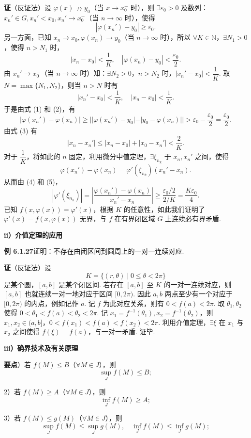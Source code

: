 \documentclass[UTF8,12pt,a4paper,fontset=fandol]{ctexart}
\begin{document}
\noindent\textbf{证}\quad （反证法）设 $\varphi(x)\nrightarrow y_0$（当 $x\to x_0^-$ 时），则 $\exists\varepsilon_0>0$ 及数列：$x_n'\in G,x_n'<x_0,x_n'\to x_0^-$（当 $n\to\infty$ 时），使得
\[
  |\varphi(x_n')-y_0|\ge\varepsilon_0. \tag{1}
\]
另一方面，已知 $x_n\to x_0,\varphi(x_n)\to y_0$（当 $n\to\infty$ 时），所以 $\forall K\in\mathbb{N}$，$\exists N_1>0$，使得 $n>N_1$ 时，
\[
  |x_n-x_0|<\frac1K,\quad
  |\varphi(x_n)-y_0|<\frac{\varepsilon_0}{2}. \tag{2}
\]
由 $x_n'\to x_0^-$（当 $n\to\infty$ 时）知：$\exists N_2>0$，$n>N_2$ 时，$|x_n'-x_0|<\dfrac1K$. 取 $N=\max\{N_1,N_2\}$，则当 $n>N$ 时有
\[
  |x_n'-x_0|<\frac1K,\quad |x_n-x_0|<\frac1K. \tag{3}
\]
于是由式 (1) 和 (2)，有
\[
  |\varphi(x_n')-\varphi(x_n)|
  \ge ||\varphi(x_n')-y_0|-|y_0-\varphi(x_n)||>\varepsilon_0-\frac{\varepsilon_0}{2}
  =\frac{\varepsilon_0}{2}. \tag{4}
\]
由式 (3) 有
\[
  |x_n-x_n'|\le |x_n-x_0|+|x_0-x_n'|<\frac2K. \tag{5}
\]
对于 $\dfrac1K$，将如此的 $n$ 固定，利用微分中值定理，$\exists\xi_{n_k}$ 于 $x_n,x_n'$ 之间，使得
\[
  \varphi(x_n')-\varphi(x_n)=\varphi'(\xi_{n_k})(x_n'-x_n).
\]
从而由 (4) 和 (5)，
\[
  |\varphi'(\xi_{n_k})|
  =\left|\frac{\varphi(x_n')-\varphi(x_n)}{x_n'-x_n}\right|
  \ge \frac{\varepsilon_0/2}{2/K}
  =\frac{K\varepsilon_0}{4}.
\]
已知 $f(x,\varphi(x))=\varphi'(x)$，根据 $K$ 的任意性，如此我们证明了 $\varphi'(x)=f(x,\varphi(x))$ 无界，与 $f$ 在有界闭区域 $G$ 上连续必有界矛盾.

\noindent\textbf{ii）介值定理的应用}

\noindent\textbf{例 6.1.27}\quad 证明：不存在由闭区间到圆周上的一对一连续对应.

\noindent\textbf{证}\quad （反证法）设
\[
  K=\{(r,\theta)\mid 0\le\theta<2\pi\}
\]
是某个圆，$[a,b]$ 是某个闭区间. 若存在 $[a,b]$ 至 $K$ 的一对一连续对应，则 $[a,b]$ 也就连续一对一地对应于区间 $[0,2\pi)$. 因此 $a,b$ 两点至少有一个对应于 $[0,2\pi)$ 的内点，例如记作 $a$. 记 $f$ 为此对应关系，则有 $0<f(a)<2\pi$. 取 $\theta_1,\theta_2$ 使得 $0<\theta_1<f(a)<\theta_2<2\pi$. 记 $x_1=f^{-1}(\theta_1),x_2=f^{-1}(\theta_2)$，则 $x_1,x_2\in(a,b]$，$0<f(x_1)<f(a)<f(x_2)<2\pi$. 利用介值定理，$\exists\xi$ 在 $x_1$ 与 $x_2$ 之间使得 $f(\xi)=f(a)$，与一对一矛盾. 证毕.

\noindent\textbf{iii）确界技术及有关原理}

\noindent\textbf{要点}）若 $f(M)\le B$（$\forall M\in J$），则
\[
  \sup_J f(M)\le B;
\]

2）若 $f(M)\ge A$（$\forall M\in J$），则
\[
  \inf_J f(M)\ge A;
\]

3）若 $f(M)\le g(M)$（$\forall M\in J$），则
\[
  \sup_J f(M)\le \sup_J g(M),\quad
  \inf_J f(M)\le \inf_J g(M);
\]
\end{document}
